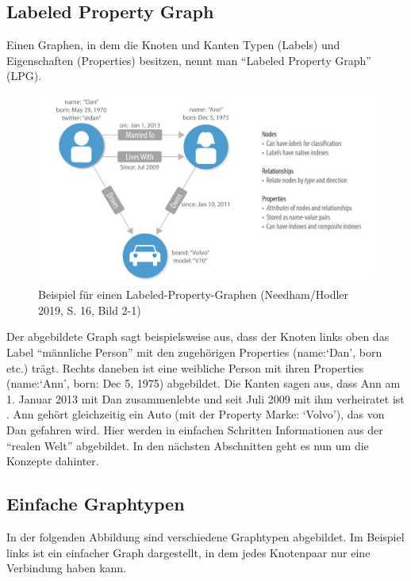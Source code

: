 \documentclass[ngerman,]{scrreprt}
\begin{document}
\hypertarget{labeled-property-graph}{%
\subsection{Labeled Property Graph}\label{labeled-property-graph}}

Einen Graphen, in dem die Knoten und Kanten Typen (Labels) und Eigenschaften (Properties) besitzen, nennt man ``Labeled Property Graph'' (LPG).

\begin{figure}
\centering
\includegraphics{Bilder/Graph-Algorithms/16-2-1-LabeledPropertyGraph.png}
\caption{Beispiel für einen Labeled-Property-Graphen (Needham/Hodler 2019, S. 16, Bild 2-1)}
\end{figure}

Der abgebildete Graph sagt beispielsweise aus, dass der Knoten links oben das Label ``männliche Person'' mit den zugehörigen Properties (name:`Dan', born etc.) trägt. Rechts daneben ist eine weibliche Person mit ihren Properties (name:`Ann', born: Dec 5, 1975) abgebildet. Die Kanten sagen aus, dass Ann am 1. Januar 2013 mit Dan zusammenlebte und seit Juli 2009 mit ihm verheiratet ist . Ann gehört gleichzeitig ein Auto (mit der Property Marke: `Volvo'), das von Dan gefahren wird. Hier werden in einfachen Schritten Informationen aus der ``realen Welt'' abgebildet. In den nächsten Abschnitten geht es nun um die Konzepte dahinter.

\hypertarget{einfache-graphtypen}{%
\subsection{Einfache Graphtypen}\label{einfache-graphtypen}}

In der folgenden Abbildung sind verschiedene Graphtypen abgebildet. Im Beispiel links ist ein einfacher Graph dargestellt, in dem jedes Knotenpaar nur eine Verbindung haben kann.
\end{document}
